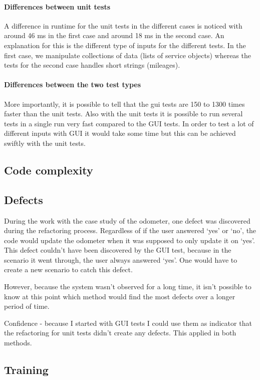 \documentclass{article}
\begin{document}
			\paragraph{Differences between unit tests}
			A difference in runtime for the unit tests in the different cases is noticed with around 46 ms in the first case and around 18 ms in the second case. An explanation for this is the different type of inputs for the different tests. In the first case, we manipulate collections of data (lists of service objects) whereas the tests for the second case handles short strings (mileages).

			\paragraph{Differences between the two test types}			
			More importantly, it is possible to tell that the gui tests are 150 to 1300 times faster than the unit tests. Also with the unit tests it is possible to run several tests in a single run very fast compared to the GUI tests. In order to test a lot of different inputs with GUI it would take some time but this can be achieved swiftly with the unit tests.

		\subsection{Code complexity}
		
		\subsection{Defects}	
		During the work with the case study of the odometer, one defect was discovered during the refactoring process. Regardless of if the user answered `yes' or `no', the code would update the odometer when it was supposed to only update it on `yes'. This defect couldn't have been discovered by the GUI test, because in the scenario it went through, the user always answered `yes'. One would have to create a new scenario to catch this defect. 

		However, because the system wasn't observed for a long time, it isn't possible to know at this point which method would find the most defects over a longer period of time.

		Confidence - because I started with GUI tests I could use them as indicator that the refactoring for unit tests didn't create any defects. This applied in both methods.

		\subsection{Training}
\end{document}
